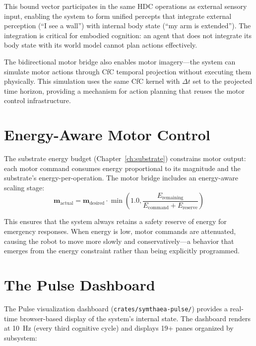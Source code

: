 \documentclass[12pt]{book}
\begin{document}
This bound vector participates in the same HDC operations as external sensory input, enabling the system to form unified percepts that integrate external perception (``I see a wall'') with internal body state (``my arm is extended''). The integration is critical for embodied cognition: an agent that does not integrate its body state with its world model cannot plan actions effectively.

The bidirectional motor bridge also enables motor imagery---the system can simulate motor actions through CfC temporal projection without executing them physically. This simulation uses the same CfC kernel with $\Delta t$ set to the projected time horizon, providing a mechanism for action planning that reuses the motor control infrastructure.

\section{Energy-Aware Motor Control}

The substrate energy budget (Chapter~\ref{ch:substrate}) constrains motor output: each motor command consumes energy proportional to its magnitude and the substrate's energy-per-operation. The motor bridge includes an energy-aware scaling stage:
\begin{equation}
\mathbf{m}_{\text{actual}} = \mathbf{m}_{\text{desired}} \cdot \min\left(1.0, \frac{E_{\text{remaining}}}{E_{\text{command}} + E_{\text{reserve}}}\right)
\end{equation}

This ensures that the system always retains a safety reserve of energy for emergency responses. When energy is low, motor commands are attenuated, causing the robot to move more slowly and conservatively---a behavior that emerges from the energy constraint rather than being explicitly programmed.

\section{The Pulse Dashboard}

The Pulse visualization dashboard (\texttt{crates/symthaea-pulse/}) provides a real-time browser-based display of the system's internal state. The dashboard renders at 10~Hz (every third cognitive cycle) and displays 19+ panes organized by subsystem:
\end{document}
